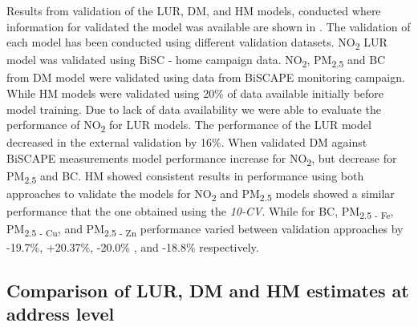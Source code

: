 \documentclass{article}
\begin{document}
Results from validation of the LUR, DM, and HM models, conducted where information for validated the model was available are shown in . The validation of each model has been conducted using different validation datasets. NO\textsubscript{2} LUR model was validated using BiSC - home campaign data. NO\textsubscript{2}, PM\textsubscript{2.5} and BC from DM model were validated using data from BiSCAPE monitoring campaign. While HM models were validated using 20\% of data available initially before model training. Due to lack of data availability we were able to evaluate the performance of NO\textsubscript{2} for LUR models. The performance of the LUR model decreased in the external validation by 16\%. When validated DM against BiSCAPE measurements model performance increase for NO\textsubscript{2}, but decrease for PM\textsubscript{2.5} and BC. HM showed consistent results in performance using both approaches to validate the models for NO\textsubscript{2} and PM\textsubscript{2.5} models showed a similar performance that the one obtained using the \textit{10-CV}. While for BC, PM\textsubscript{2.5 - Fe}, PM\textsubscript{2.5 - Cu}, and PM\textsubscript{2.5 - Zn} performance varied between validation approaches by -19.7\%, +20.37\%, -20.0\% , and -18.8\% respectively.


\subsection{Comparison of LUR, DM and HM estimates at address level} %
\end{document}
